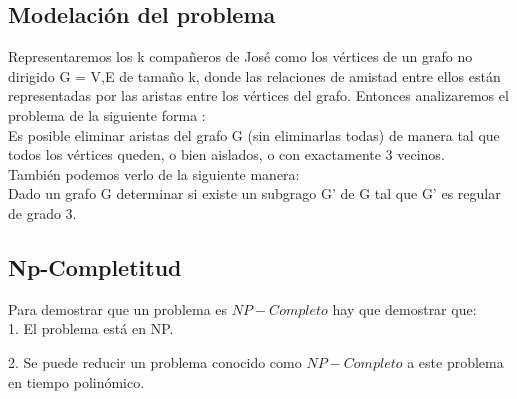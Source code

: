 \documentclass[
10pt, %
a4paper, %
oneside, %
headinclude,footinclude, %
BCOR5mm, %
]{scrartcl}
\begin{document}




\subsection{Modelación del problema}

Representaremos los k compañeros de José como los vértices de un grafo no dirigido G = {V,E} de tamaño k, donde las relaciones de amistad entre ellos están representadas
por las aristas entre los vértices del grafo. Entonces analizaremos el problema de la siguiente forma :\\

Es posible eliminar aristas del grafo G (sin eliminarlas todas) de manera tal que todos los vértices queden, o bien aislados, o con exactamente 3 vecinos. \\

También podemos verlo de la siguiente manera: \\

Dado un grafo G determinar si existe un subgrago G' de G tal que G' es regular de grado 3.\\


\subsection{Np-Completitud}

Para demostrar que un problema es $NP-Completo$ hay que demostrar que:\\

1. El problema está en NP.

2. Se puede reducir un problema conocido como $NP-Completo$ a este problema en tiempo polinómico.\\
\end{document}
